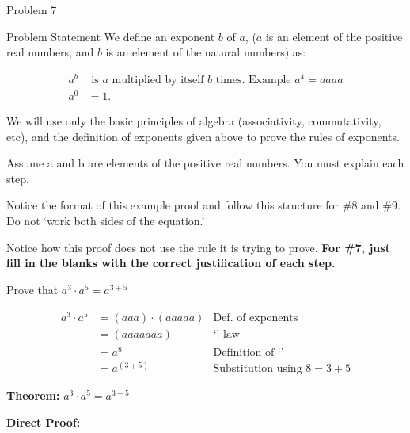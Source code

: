 \begin{problem}{Problem 7}
    \begin{statement}{Problem Statement}
        We define an exponent $b$ of $a$, ($a$ is an element of the positive real numbers, and $b$ is an element of the natural numbers) as:

        \begin{align*}
            a^{b} & \text{ is } a \text{ multiplied by itself } b \text{ times. Example } a^{4} = aaaa \\
            a^{0} & = 1.
        \end{align*}

        We will use only the basic principles of algebra (associativity, commutativity, etc), and the definition of exponents given above to prove the rules of exponents. \vspace*{1em}

        Assume a and b are elements of the positive real numbers. You must explain each step. \vspace*{1em}

        Notice the format of this example proof and follow this structure for \#8 and \#9. Do not `work both sides of the equation.' \vspace*{1em}

        Notice how this proof does not use the rule it is trying to prove. \textbf{For \#7, just fill in the blanks with the correct justification of each step.} \vspace*{1em}

        Prove that $a^{3} \cdot a^{5} = a^{3+5}$ \vspace*{1em}

        \begin{align*}
            a^{3} \cdot a^{5} & = (aaa) \cdot (aaaaa) & \text{Def. of exponents} \\
            & = (aaaaaaa) & \text{`' law} \\
            & = a^{8} & \text{Definition of `'} \\
            & = a^{(3 + 5)} & \text{Substitution using } 8 = 3 + 5
        \end{align*}
    \end{statement}

    \begin{Highlight}[Solution]
        \textbf{Theorem:} $a^{3}\cdot a^{5} = a^{3 + 5}$ \vspace*{1em}

        \textbf{Direct Proof:} \vspace*{1em}


\end{Highlight}
\end{problem}
